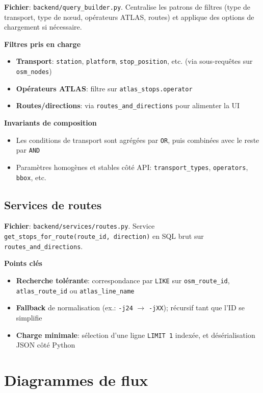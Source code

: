\textbf{Fichier}: \texttt{backend/query\_builder.py}. Centralise les patrons de filtres (type de transport, type de nœud, opérateurs ATLAS, routes) et applique des options de chargement si nécessaire.

\textbf{Filtres pris en charge}
\begin{itemize}
  \item \textbf{Transport}: \texttt{station}, \texttt{platform}, \texttt{stop\_position}, etc. (via sous-requêtes sur \texttt{osm\_nodes})
  \item \textbf{Opérateurs ATLAS}: filtre sur \texttt{atlas\_stops.operator}
  \item \textbf{Routes/directions}: via \texttt{routes\_and\_directions} pour alimenter la UI
\end{itemize}

\textbf{Invariants de composition}
\begin{itemize}
  \item Les conditions de transport sont agrégées par \texttt{OR}, puis combinées avec le reste par \texttt{AND}
  \item Paramètres homogènes et stables côté API: \texttt{transport\_types}, \texttt{operators}, \texttt{bbox}, etc.
\end{itemize}

\subsection*{Services de routes}

\textbf{Fichier}: \texttt{backend/services/routes.py}. Service \texttt{get\_stops\_for\_route(route\_id, direction)} en SQL brut sur \texttt{routes\_and\_directions}.

\textbf{Points clés}
\begin{itemize}
  \item \textbf{Recherche tolérante}: correspondance par \texttt{LIKE} sur \texttt{osm\_route\_id}, \texttt{atlas\_route\_id} ou \texttt{atlas\_line\_name}
  \item \textbf{Fallback} de normalisation (ex.: \texttt{-j24} \(\rightarrow\) \texttt{-jXX}); récursif tant que l'ID se simplifie
  \item \textbf{Charge minimale}: sélection d'une ligne \texttt{LIMIT 1} indexée, et désérialisation JSON côté Python
\end{itemize}

\section{Diagrammes de flux}

